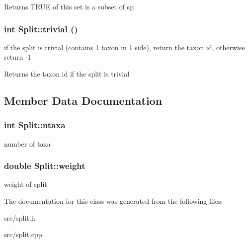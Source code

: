 \begin{DoxyReturn}{Returns}
TRUE of this set is a subset of sp 
\end{DoxyReturn}
\hypertarget{classSplit_a96875580ea7a3e02f013951ba4b41596}{
\subsubsection[{trivial}]{\setlength{\rightskip}{0pt plus 5cm}int Split::trivial ()}}
\label{classSplit_a96875580ea7a3e02f013951ba4b41596}
if the split is trivial (contains 1 taxon in 1 side), return the taxon id, otherwise return -\/1 \begin{DoxyReturn}{Returns}
the taxon id if the split is trivial 
\end{DoxyReturn}


\subsection{Member Data Documentation}
\hypertarget{classSplit_a41a18ab8832241bb319a4ddbca3af8b5}{
\subsubsection[{ntaxa}]{\setlength{\rightskip}{0pt plus 5cm}int {\bf Split::ntaxa}}}
\label{classSplit_a41a18ab8832241bb319a4ddbca3af8b5}
number of taxa \hypertarget{classSplit_aa8845f08e5d041e68ed0475fca6954c5}{
\subsubsection[{weight}]{\setlength{\rightskip}{0pt plus 5cm}double {\bf Split::weight}}}
\label{classSplit_aa8845f08e5d041e68ed0475fca6954c5}
weight of split 

The documentation for this class was generated from the following files:\begin{DoxyCompactItemize}
\item 
src/split.h\item 
src/split.cpp\end{DoxyCompactItemize}
